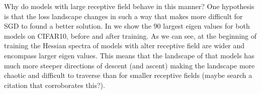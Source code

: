 Why do models with large receptive field behave in this manner? One hypothesis is that the loss landscape changes in
such a way that makes more difficult for SGD to found a better solution. In  we show the 90 largest eigen values for both models on CIFAR10, before and after training. As
we can see, at the beginning of training the Hessian spectra of models with alter receptive field are wider and
encompass larger eigen values. This means that the landscape of that models has much more steeper directions of descent
(and ascent) making the landscape more chaotic  and difficult to traverse than for smaller receptive fields (maybe search
a citation that corroborates this?).





